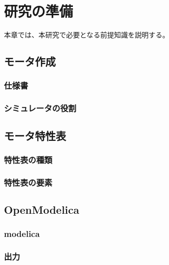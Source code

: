 \chapter{研究の準備}\label{cha:Preparation}
本章では、本研究で必要となる前提知識を説明する。

\section{モータ作成}\label{motor}
\subsection{仕様書}\label{siyo}
\subsection{シミュレータの役割}\label{simu}

\section{モータ特性表}\label{toku}
\subsection{特性表の種類}\label{syu}
\subsection{特性表の要素}\label{ele}

\section{OpenModelica}\label{OM}

\subsection{modelica}\label{modelica}
\subsection{出力}\label{output}




